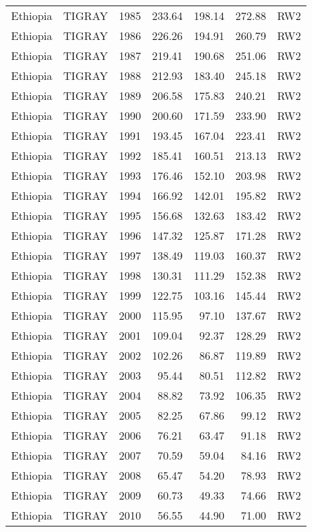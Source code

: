 \begin{longtable}{lllrrrl}
  Ethiopia & TIGRAY & 1985 & 233.64 & 198.14 & 272.88 & RW2 \\ 
  Ethiopia & TIGRAY & 1986 & 226.26 & 194.91 & 260.79 & RW2 \\ 
  Ethiopia & TIGRAY & 1987 & 219.41 & 190.68 & 251.06 & RW2 \\ 
  Ethiopia & TIGRAY & 1988 & 212.93 & 183.40 & 245.18 & RW2 \\ 
  Ethiopia & TIGRAY & 1989 & 206.58 & 175.83 & 240.21 & RW2 \\ 
  Ethiopia & TIGRAY & 1990 & 200.60 & 171.59 & 233.90 & RW2 \\ 
  Ethiopia & TIGRAY & 1991 & 193.45 & 167.04 & 223.41 & RW2 \\ 
  Ethiopia & TIGRAY & 1992 & 185.41 & 160.51 & 213.13 & RW2 \\ 
  Ethiopia & TIGRAY & 1993 & 176.46 & 152.10 & 203.98 & RW2 \\ 
  Ethiopia & TIGRAY & 1994 & 166.92 & 142.01 & 195.82 & RW2 \\ 
  Ethiopia & TIGRAY & 1995 & 156.68 & 132.63 & 183.42 & RW2 \\ 
  Ethiopia & TIGRAY & 1996 & 147.32 & 125.87 & 171.28 & RW2 \\ 
  Ethiopia & TIGRAY & 1997 & 138.49 & 119.03 & 160.37 & RW2 \\ 
  Ethiopia & TIGRAY & 1998 & 130.31 & 111.29 & 152.38 & RW2 \\ 
  Ethiopia & TIGRAY & 1999 & 122.75 & 103.16 & 145.44 & RW2 \\ 
  Ethiopia & TIGRAY & 2000 & 115.95 & 97.10 & 137.67 & RW2 \\ 
  Ethiopia & TIGRAY & 2001 & 109.04 & 92.37 & 128.29 & RW2 \\ 
  Ethiopia & TIGRAY & 2002 & 102.26 & 86.87 & 119.89 & RW2 \\ 
  Ethiopia & TIGRAY & 2003 & 95.44 & 80.51 & 112.82 & RW2 \\ 
  Ethiopia & TIGRAY & 2004 & 88.82 & 73.92 & 106.35 & RW2 \\ 
  Ethiopia & TIGRAY & 2005 & 82.25 & 67.86 & 99.12 & RW2 \\ 
  Ethiopia & TIGRAY & 2006 & 76.21 & 63.47 & 91.18 & RW2 \\ 
  Ethiopia & TIGRAY & 2007 & 70.59 & 59.04 & 84.16 & RW2 \\ 
  Ethiopia & TIGRAY & 2008 & 65.47 & 54.20 & 78.93 & RW2 \\ 
  Ethiopia & TIGRAY & 2009 & 60.73 & 49.33 & 74.66 & RW2 \\ 
  Ethiopia & TIGRAY & 2010 & 56.55 & 44.90 & 71.00 & RW2 \\ 

\end{longtable}
